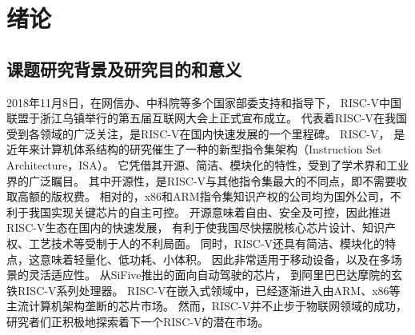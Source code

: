 \chapter{绪论}





\section{课题研究背景及研究目的和意义}
2018年11月8日，在网信办、中科院等多个国家部委支持和指导下，
RISC-V中国联盟于浙江乌镇举行的第五届互联网大会上正式宣布成立。
代表着RISC-V在我国受到各领域的广泛关注，是RISC-V在国内快速发展的一个里程碑。
RISC-V\cite{asanovic2014instruction}，
是近年来计算机体系结构的研究催生了一种的新型指令集架构（Instruction Set Architecture，ISA）。
它凭借其开源、简洁、模块化的特性，受到了学术界和工业界的广泛瞩目。
其中开源性，是RISC-V与其他指令集最大的不同点，即不需要收取高额的版权费。
相对的，x86和ARM指令集知识产权的公司均为国外公司，不利于我国实现关键芯片的自主可控。
开源意味着自由、安全及可控，因此推进RISC-V生态在国内的快速发展，
有利于使我国尽快摆脱核心芯片设计、知识产权、工艺技术等受制于人的不利局面。
同时，RISC-V还具有简洁、模块化的特点，这意味着轻量化、低功耗、小体积。
因此非常适用于移动设备，以及在多场景的灵活适应性。
从SiFive推出的面向自动驾驶的芯片\cite{sifive-automotive}，
到阿里巴巴达摩院的玄铁RISC-V系列处理器\cite{xuantie}。
RISC-V在嵌入式领域中，已经逐渐进入由ARM、x86等主流计算机架构垄断的芯片市场。
然而，RISC-V并不止步于物联网领域的成功，研究者们正积极地探索着下一个RISC-V的潜在市场。

